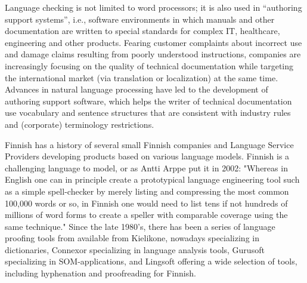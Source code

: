 \documentclass{../../metanetpaper}
\begin{document}
\begin{Parallel}[c]{79mm}{78mm}
{%

Language checking is not limited to word processors; it is also used
in “authoring support systems”, i.e., software environments in which
manuals and other documentation are written to special standards for
complex IT, healthcare, engineering and other products. Fearing
customer complaints about incorrect use and damage claims resulting
from poorly understood instructions, companies are increasingly
focusing on the quality of technical documentation while targeting the
international market (via translation or localization) at the same
time. Advances in natural language processing have led to the
development of authoring support software, which helps the writer of
technical documentation use vocabulary and sentence structures that
are consistent with industry rules and (corporate) terminology
restrictions.


% 
% 
% 
% 
% 
% 
% 
% 
% 
% 
% 

Finnish has a history of several small Finnish companies and Language
Service Providers developing products based on various language
models. Finnish is a challenging language to model, or as Antti Arppe
put it in 2002: "Whereas in English one can in principle create a
prototypical language engineering tool such as a simple spell-checker
by merely listing and compressing the most common 100,000 words or so,
in Finnish one would need to list tens if not hundreds of millions of
word forms to create a speller with comparable coverage using the same
technique." \cite{NoPath} Since the late 1980's, there has been a
series of language proofing tools from available from Kielikone,
nowadays specializing in dictionaries, Connexor specializing in
language analysis tools, Gurusoft specializing in SOM-applications,
and Lingsoft offering a wide selection of tools,
including hyphenation and proofreading for Finnish.

}
\end{Parallel}
\end{document}

